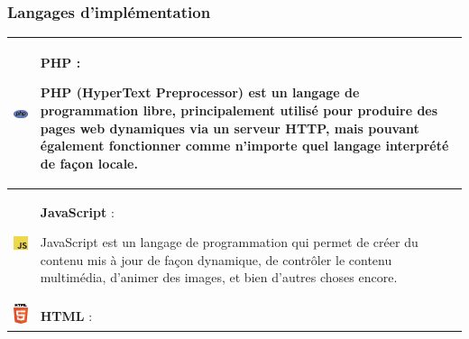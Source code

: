 \documentclass{article}
\begin{document}
                \subsubsection{Langages d'implémentation}
                    \begin{table}[h!]
                        \centering
                        \begin{tabular}{|m{2cm}|m{15cm}|}
                            \hline
                            \includegraphics[width=2cm]{assets/logos/PHP_logo.png} &
                            \textbf{PHP} :
                            
                            PHP (HyperText Preprocessor) est un langage de programmation libre, principalement utilisé pour produire des pages web dynamiques via un serveur HTTP, mais pouvant également fonctionner comme n'importe quel langage interprété de façon locale. \\
                            \hline
                            \includegraphics[width=2cm]{assets/logos/js.jpg} &
                            \textbf{JavaScript} :
                            
                            JavaScript est un langage de programmation qui permet de créer du contenu mis à jour de façon dynamique, de contrôler le contenu multimédia, d'animer des images, et bien d'autres choses encore. \\
                            \hline
                            \includegraphics[width=2cm]{assets/logos/html.jpg} &
                            \textbf{HTML} :
                            

\end{tabular}
\end{table}
\end{document}
